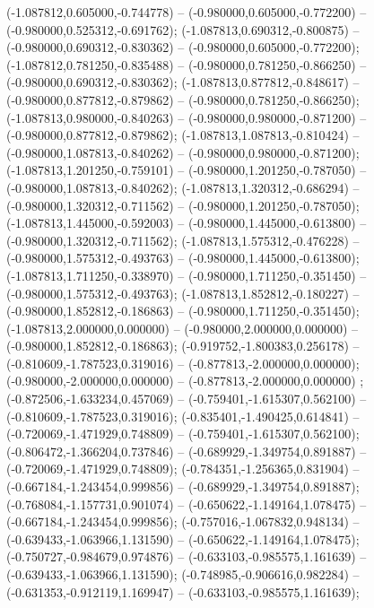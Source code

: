  (-1.087812,0.605000,-0.744778) -- (-0.980000,0.605000,-0.772200) -- (-0.980000,0.525312,-0.691762);
 (-1.087813,0.690312,-0.800875) -- (-0.980000,0.690312,-0.830362) -- (-0.980000,0.605000,-0.772200);
 (-1.087812,0.781250,-0.835488) -- (-0.980000,0.781250,-0.866250) -- (-0.980000,0.690312,-0.830362);
 (-1.087813,0.877812,-0.848617) -- (-0.980000,0.877812,-0.879862) -- (-0.980000,0.781250,-0.866250);
 (-1.087813,0.980000,-0.840263) -- (-0.980000,0.980000,-0.871200) -- (-0.980000,0.877812,-0.879862);
 (-1.087813,1.087813,-0.810424) -- (-0.980000,1.087813,-0.840262) -- (-0.980000,0.980000,-0.871200);
 (-1.087813,1.201250,-0.759101) -- (-0.980000,1.201250,-0.787050) -- (-0.980000,1.087813,-0.840262);
 (-1.087813,1.320312,-0.686294) -- (-0.980000,1.320312,-0.711562) -- (-0.980000,1.201250,-0.787050);
 (-1.087813,1.445000,-0.592003) -- (-0.980000,1.445000,-0.613800) -- (-0.980000,1.320312,-0.711562);
 (-1.087813,1.575312,-0.476228) -- (-0.980000,1.575312,-0.493763) -- (-0.980000,1.445000,-0.613800);
 (-1.087813,1.711250,-0.338970) -- (-0.980000,1.711250,-0.351450) -- (-0.980000,1.575312,-0.493763);
 (-1.087813,1.852812,-0.180227) -- (-0.980000,1.852812,-0.186863) -- (-0.980000,1.711250,-0.351450);
 (-1.087813,2.000000,0.000000) -- (-0.980000,2.000000,0.000000) -- (-0.980000,1.852812,-0.186863);
 (-0.919752,-1.800383,0.256178) -- (-0.810609,-1.787523,0.319016) -- (-0.877813,-2.000000,0.000000);
 (-0.980000,-2.000000,0.000000) -- (-0.877813,-2.000000,0.000000) ;
 (-0.872506,-1.633234,0.457069) -- (-0.759401,-1.615307,0.562100) -- (-0.810609,-1.787523,0.319016);
 (-0.835401,-1.490425,0.614841) -- (-0.720069,-1.471929,0.748809) -- (-0.759401,-1.615307,0.562100);
 (-0.806472,-1.366204,0.737846) -- (-0.689929,-1.349754,0.891887) -- (-0.720069,-1.471929,0.748809);
 (-0.784351,-1.256365,0.831904) -- (-0.667184,-1.243454,0.999856) -- (-0.689929,-1.349754,0.891887);
 (-0.768084,-1.157731,0.901074) -- (-0.650622,-1.149164,1.078475) -- (-0.667184,-1.243454,0.999856);
 (-0.757016,-1.067832,0.948134) -- (-0.639433,-1.063966,1.131590) -- (-0.650622,-1.149164,1.078475);
 (-0.750727,-0.984679,0.974876) -- (-0.633103,-0.985575,1.161639) -- (-0.639433,-1.063966,1.131590);
 (-0.748985,-0.906616,0.982284) -- (-0.631353,-0.912119,1.169947) -- (-0.633103,-0.985575,1.161639);
